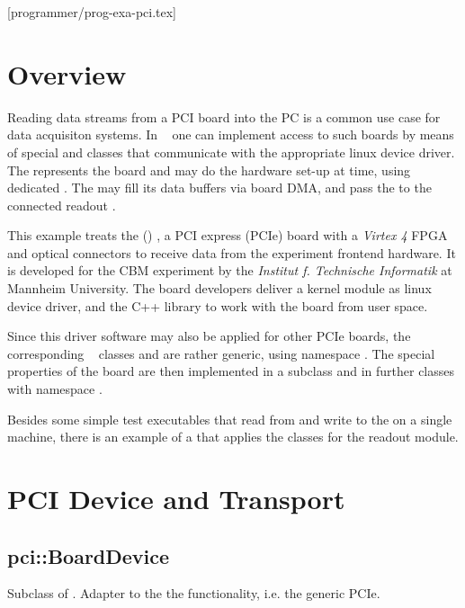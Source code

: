 [programmer/prog-exa-pci.tex]

\section{Overview}
Reading data streams from a PCI board into the PC is a common use case
for data acquisiton systems. In \dabc~ one can implement access to
such boards by means of special  and 
classes that communicate with the appropriate linux device driver.
The  represents the board and may do the hardware set-up 
at  time, using dedicated . 
The  may fill its data buffers via board DMA, and
pass the  to the connected readout . 

This example treats the
 (\ABB) \cite{AbbDescription}
, 
a PCI express (PCIe) board 
 with a {\em Virtex 4}
FPGA and optical connectors to receive data from the experiment frontend
hardware. It is developed for the CBM experiment \cite{CBM-stat-rep}
by the {\em Institut f. Technische Informatik} at Mannheim University. 
The board developers deliver a kernel module as linux device driver,
and the  C++ library to work with the board from user space.

Since this driver software may also be applied for other PCIe boards,
the corresponding \dabc~ classes  and 
are rather generic, using namespace .
The special properties of the \ABB board are then implemented in
a  subclass and in further classes with namespace
. 

Besides some simple test executables that read from and write to the 
\ABB on a single machine, there is an example of a 
that applies the \ABB classes for the readout module.    
 


\section{PCI Device and Transport}


\subsection{pci::BoardDevice}
Subclass of . Adapter to the the  functionality, i.e. the generic PCIe.

